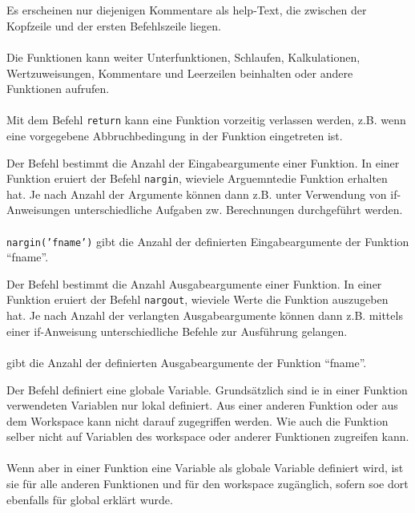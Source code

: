 \\\\
Es erscheinen nur diejenigen Kommentare als help-Text, die zwischen der Kopfzeile und der ersten Befehlszeile liegen.
\\\\
Die Funktionen kann weiter Unterfunktionen, Schlaufen, Kalkulationen, Wertzuweisungen, Kommentare und Leerzeilen beinhalten oder andere Funktionen aufrufen.
\\\\
Mit dem Befehl {\color{red}\texttt{return}} kann eine Funktion vorzeitig verlassen werden, z.B. wenn eine vorgegebene Abbruchbedingung in der Funktion eingetreten ist.

Der Befehl  bestimmt die Anzahl der Eingabeargumente einer Funktion. In einer Funktion eruiert der Befehl {\color{red}\texttt{nargin}}, wieviele Arguemntedie Funktion erhalten hat. Je nach Anzahl der Argumente können dann z.B. unter Verwendung von if-Anweisungen unterschiedliche Aufgaben zw. Berechnungen durchgeführt werden.
\\\\
{\color{red}\texttt{nargin('fname')}} gibt die Anzahl der definierten Eingabeargumente der Funktion ``fname''.

Der Befehl  bestimmt die Anzahl Ausgabeargumente einer Funktion. In einer Funktion eruiert der Befehl {\color{red}\texttt{nargout}}, wieviele Werte die Funktion auszugeben hat. Je nach Anzahl der verlangten Ausgabeargumente können dann z.B. mittels einer if-Anweisung unterschiedliche Befehle zur Ausführung gelangen.
\\\\
{} gibt die Anzahl der definierten Ausgabeargumente der Funktion ``fname''.

Der Befehl  definiert eine globale Variable. Grundsätzlich sind ie in einer Funktion verwendeten Variablen nur lokal definiert. Aus einer anderen Funktion oder aus dem Workspace kann nicht darauf zugegriffen werden. Wie auch die Funktion selber nicht auf Variablen des workspace oder anderer Funktionen zugreifen kann.
\\\\
Wenn aber in einer Funktion eine Variable als globale Variable definiert wird, ist sie für alle anderen Funktionen und für den workspace zugänglich, sofern soe dort ebenfalls für global erklärt wurde.

